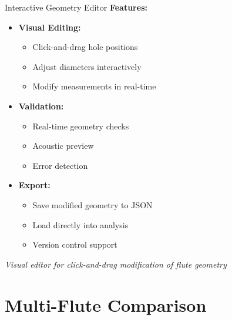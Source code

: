 \documentclass[aspectratio=169,10pt]{beamer}
\begin{document}
\begin{frame}{Interactive Geometry Editor}
\textbf{Features:}

\begin{itemize}
    \item \textbf{Visual Editing:}
    \begin{itemize}
        \item Click-and-drag hole positions
        \item Adjust diameters interactively
        \item Modify measurements in real-time
    \end{itemize}
    
    \item \textbf{Validation:}
    \begin{itemize}
        \item Real-time geometry checks
        \item Acoustic preview
        \item Error detection
    \end{itemize}
    
    \item \textbf{Export:}
    \begin{itemize}
        \item Save modified geometry to JSON
        \item Load directly into analysis
        \item Version control support
    \end{itemize}
\end{itemize}

\vspace{0.3cm}
\textit{Visual editor for click-and-drag modification of flute geometry}
\end{frame}

\section{Multi-Flute Comparison}
\end{document}
